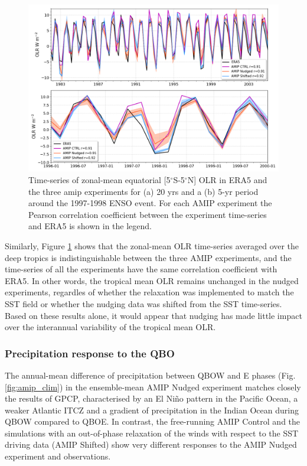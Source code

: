 \begin{figure}[t!]
\centering
 \includegraphics[width=\linewidth]{figures/olr_tseries.png}
\caption[Tropical mean OLR time series.]{Time-series of zonal-mean equatorial [5$^\circ$S-5$^\circ$N]  OLR in ERA5 and the three amip experiments for (a) 20 yrs and a (b) 5-yr period around the 1997-1998 ENSO event. For each AMIP experiment the Pearson correlation coefficient between the experiment time-series and ERA5 is shown in the legend. }
\label{fig:olramip_tseries}
\end{figure}

Similarly, Figure \ref{fig:olramip_tseries} shows that the zonal-mean OLR time-series averaged over the deep tropics is indistinguishable between the three AMIP experiments, and the time-series of all the experiments have the same correlation coefficient with ERA5. In other words, the tropical mean OLR remains unchanged in the nudged experiments, regardles of whether the relaxation was implemented to match the SST field or whether the nudging data was shifted from the SST time-series. 
Based on these results alone, it would appear that nudging has made little impact over the interannual variability of the tropical mean OLR. 


\subsubsection{Precipitation response to the QBO}




The annual-mean difference of precipitation between QBOW and E phases (Fig. \ref{fig:amip_clim}) in the ensemble-mean AMIP Nudged experiment matches closely the results of GPCP, characterised by an El Niño pattern in the Pacific Ocean, a weaker Atlantic ITCZ and a gradient of precipitation in the Indian Ocean during QBOW compared to QBOE. 
In contrast, the free-running AMIP Control and the simulations with an out-of-phase relaxation of the winds with respect to the SST driving data (AMIP Shifted) show very different responses to the AMIP Nudged experiment and observations. 

